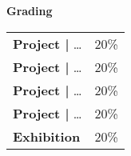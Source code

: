 \documentclass[11pt,article,oneside]{memoir}
\begin{document}
\noindent \textbf{Grading}
%
\begin{table}[H]
\small
\begin{tabular}{l l}
%
\textbf{Project |} \ldots & 20\% \\
\textbf{Project |} \ldots & 20\% \\
\textbf{Project |} \ldots & 20\% \\
\textbf{Project |} \ldots & 20\% \\
\textbf{Exhibition} & 20\% \\
%
\end{tabular}
\end{table}
\end{document}
